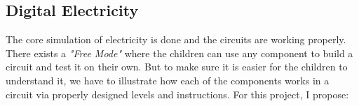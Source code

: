 \documentclass[preprint,12pt]{elsarticle}
\begin{document}










\subsection{Digital Electricity}

The core simulation of electricity is done and the circuits are working properly. There exists a \textit{"Free Mode"} where the children can use any component to build a circuit and test it on their own. But to make sure it is easier for the children to understand it, we have to illustrate how each of the components works in a circuit via properly designed levels and instructions. For this project, I propose:
\end{document}
